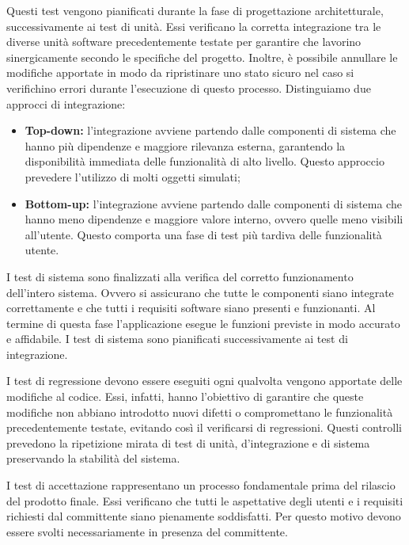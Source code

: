 Questi test vengono pianificati durante la fase di progettazione architetturale, successivamente ai
test di unità. Essi verificano la corretta integrazione tra le diverse unità software
precedentemente testate per garantire che lavorino sinergicamente secondo le specifiche del progetto. Inoltre, è possibile annullare le modifiche
apportate in modo da ripristinare uno stato sicuro nel caso si verifichino errori durante l'esecuzione di questo processo. Distinguiamo
due approcci di integrazione:
\begin{itemize}
	\item \textbf{Top-down:} l'integrazione avviene partendo dalle componenti di sistema che hanno più dipendenze e maggiore rilevanza esterna, garantendo la disponibilità immediata delle funzionalità di alto livello. Questo approccio prevedere l'utilizzo di molti oggetti simulati;
	\item \textbf{Bottom-up:} l'integrazione avviene partendo dalle componenti di sistema che hanno meno dipendenze e maggiore valore interno, ovvero quelle meno visibili all'utente. Questo comporta una fase di test più tardiva delle funzionalità utente.
\end{itemize}

I test di sistema sono finalizzati alla verifica del corretto funzionamento dell'intero sistema.
Ovvero si assicurano che tutte le componenti siano integrate correttamente e che tutti i requisiti software
siano presenti e funzionanti. Al termine di questa fase l'applicazione esegue le funzioni previste in modo accurato e affidabile.
I test di sistema sono pianificati successivamente ai test di integrazione.

I test di regressione devono essere eseguiti ogni qualvolta vengono apportate delle modifiche al codice.
Essi, infatti, hanno l'obiettivo di garantire che queste modifiche non abbiano introdotto nuovi difetti o compromettano le funzionalità
precedentemente testate, evitando così il verificarsi di regressioni. Questi controlli prevedono la ripetizione mirata di
test di unità, d'integrazione e di sistema preservando la stabilità del sistema.

I test di accettazione rappresentano un processo fondamentale prima del rilascio del prodotto finale.
Essi verificano che tutti le aspettative degli utenti e i requisiti richiesti dal committente siano pienamente soddisfatti. Per questo motivo
devono essere svolti necessariamente in presenza del committente.


